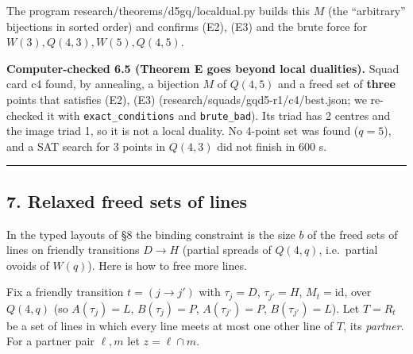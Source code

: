 \documentclass[
  11pt,
]{article}
\begin{document}
The program research/theorems/d5gq/localdual.py builds this \(M\) (the
``arbitrary'' bijections in sorted order) and confirms (E2), (E3) and
the brute force for \(W(3), Q(4,3), W(5), Q(4,5)\).

\textbf{Computer-checked 6.5 (Theorem E goes beyond local dualities).}
Squad card c4 found, by annealing, a bijection \(M\) of \(Q(4,5)\) and a
freed set of \textbf{three} points that satisfies (E2), (E3)
(research/squads/gqd5-r1/c4/best.json; we re-checked it with
\texttt{exact\_conditions} and \texttt{brute\_bad}). Its triad has 2
centres and the image triad 1, so it is not a local duality. No 4-point
set was found (\(q = 5\)), and a SAT search for 3 points in \(Q(4,3)\)
did not finish in 600 s.

\begin{center}\rule{0.5\linewidth}{0.5pt}\end{center}

\hypertarget{relaxed-freed-sets-of-lines}{%
\subsection{7. Relaxed freed sets of
lines}\label{relaxed-freed-sets-of-lines}}

In the typed layouts of §8 the binding constraint is the size \(b\) of
the freed sets of lines on friendly transitions \(D\to H\) (partial
spreads of \(Q(4,q)\), i.e.~partial ovoids of \(W(q)\)). Here is how to
free more lines.

Fix a friendly transition \(t = (j\to j')\) with \(\tau_j = D\),
\(\tau_{j'} = H\), \(M_t = \mathrm{id}\), over \(Q(4,q)\) (so
\(A(\tau_j) = L\), \(B(\tau_j) = P\), \(A(\tau_{j'}) = P\),
\(B(\tau_{j'}) = L\)). Let \(T = R_t\) be a set of lines in which every
line meets at most one other line of \(T\), its \emph{partner}. For a
partner pair \(\ell, m\) let \(z = \ell\cap m\).
\end{document}
